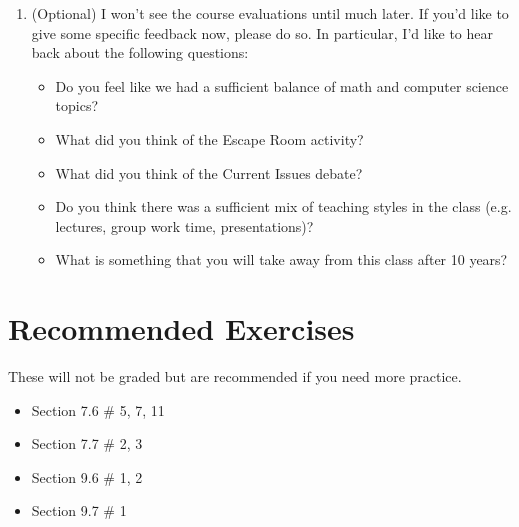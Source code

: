 \documentclass[12pt]{amsart}
\theoremstyle{plain}
\theoremstyle{definition}
\begin{document}
\begin{enumerate}[1.]
	\item (Optional) I won't see the course evaluations until much later.  If you'd like to give some specific feedback now, please do so.  In particular, I'd like to hear back about the following questions:
	\begin{itemize}
		\item Do you feel like we had a sufficient balance of math and computer science topics?
		\item What did you think of the Escape Room activity?
		\item What did you think of the Current Issues debate?
		\item Do you think there was a sufficient mix of teaching styles in the class (e.g. lectures, group work time, presentations)?
		\item What is something that you will take away from this class after 10 years?
	\end{itemize}
	\begin{framed}
	\vspace{1.5in}
	\end{framed}
	
\end{enumerate}


\section{Recommended Exercises}
\noindent These will not be graded but are recommended if you need more practice.
\begin{itemize}
	\item Section 7.6 \# 5, 7, 11
	\item Section 7.7 \# 2, 3
	\item Section 9.6 \# 1, 2
	\item Section 9.7 \# 1
\end{itemize}
	
\end{document}
